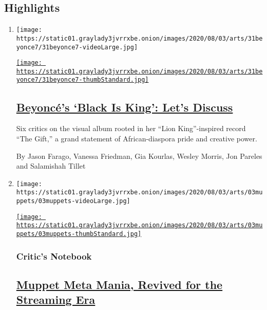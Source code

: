 \hypertarget{highlights}{%
\subsection{Highlights}\label{highlights}}

\begin{enumerate}
\def\labelenumi{\arabic{enumi}.}
\item
  \texttt{[image: https://static01.graylady3jvrrxbe.onion/images/2020/08/03/arts/31beyonce7/31beyonce7-videoLarge.jpg]}

  \href{/2020/07/31/arts/music/beyonce-black-is-king.html}{\texttt{[image: https://static01.graylady3jvrrxbe.onion/images/2020/08/03/arts/31beyonce7/31beyonce7-thumbStandard.jpg]}}

  \hypertarget{beyoncuxe9s-black-is-king-lets-discuss}{%
  \subsection{\texorpdfstring{\href{/2020/07/31/arts/music/beyonce-black-is-king.html}{Beyoncé's
  `Black Is King': Let's
  Discuss}}{Beyoncé's `Black Is King': Let's Discuss}}\label{beyoncuxe9s-black-is-king-lets-discuss}}

  Six critics on the visual album rooted in her ``Lion King''-inspired
  record ``The Gift,'' a grand statement of African-diaspora pride and
  creative power.

  By Jason Farago, Vanessa Friedman, Gia Kourlas, Wesley Morris, Jon
  Pareles and Salamishah Tillet
\item
  \texttt{[image: https://static01.graylady3jvrrxbe.onion/images/2020/08/03/arts/03muppets/03muppets-videoLarge.jpg]}

  \href{/2020/07/31/arts/television/muppets-now.html}{\texttt{[image: https://static01.graylady3jvrrxbe.onion/images/2020/08/03/arts/03muppets/03muppets-thumbStandard.jpg]}}

  \hypertarget{critics-notebook}{%
  \subsubsection{Critic's Notebook}\label{critics-notebook}}

  \hypertarget{muppet-meta-mania-revived-for-the-streaming-era}{%
  \subsection{\texorpdfstring{\href{/2020/07/31/arts/television/muppets-now.html}{Muppet
  Meta Mania, Revived for the Streaming
  Era}}{Muppet Meta Mania, Revived for the Streaming Era}}\label{muppet-meta-mania-revived-for-the-streaming-era}}


\end{enumerate}
